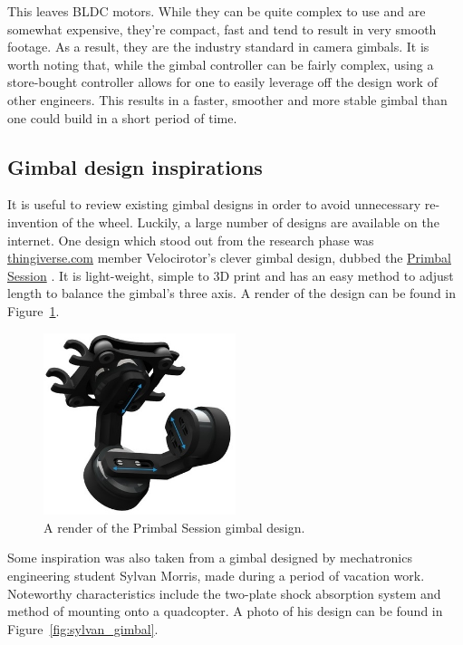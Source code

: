 This leaves BLDC motors. While they can be quite complex to use and are somewhat expensive, they're compact, fast and tend to result in very smooth footage. As a result, they are the industry standard in camera gimbals. It is worth noting that, while the gimbal controller can be fairly complex, using a store-bought controller allows for one to easily leverage off the design work of other engineers. This results in a faster, smoother and more stable gimbal than one could build in a short period of time.

\subsection{\label{ssec:gimbal_design_inspirations}Gimbal design inspirations}
It is useful to review existing gimbal designs in order to avoid unnecessary re-invention of the wheel. Luckily, a large number of designs are available on the internet. One design which stood out from the research phase was \href{https://www.thingiverse.com}{thingiverse.com} member Velocirotor's clever gimbal design, dubbed the \href{https://www.thingiverse.com/thing:2804872}{Primbal Session} \cite{website:primbal_session}. It is light-weight, simple to 3D print and has an easy method to adjust length to balance the gimbal's three axis. A render of the design can be found in Figure~\ref{fig:primbal_pic}.

\begin{figure}[h!]
  \centering
  \includegraphics[width=0.5\textwidth]{literature_review/primbal_pic.jpg}
  \caption{\label{fig:primbal_pic} A render of the Primbal Session gimbal design.}
\end{figure}

Some inspiration was also taken from a gimbal designed by mechatronics engineering student Sylvan Morris, made during a period of vacation work. Noteworthy characteristics include the two-plate shock absorption system and method of mounting onto a quadcopter. A photo of his design can be found in Figure~\ref{fig:sylvan_gimbal}.

